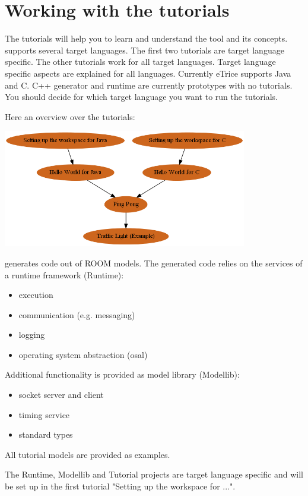 \section{Working with the tutorials}

The \eTrice{} tutorials will help you to learn and understand the \eTrice{} tool and its concepts. \eTrice{} supports 
several target languages. 
The first two tutorials are target language specific. The other tutorials work for all target languages. Target language specific aspects are explained for all languages. 
Currently eTrice supports Java and C. C++ generator and runtime are currently prototypes with no tutorials. You should decide for which target language you want to run the tutorials. 

Here an overview over the tutorials:

\includegraphics[width=0.8\textwidth]{images/012-tutorial-structure.png}

\eTrice{} generates code out of ROOM models. The generated code relies on the services of a runtime 
framework (Runtime):
\begin{itemize}
\item execution
\item communication (e.g. messaging)
\item logging
\item operating system abstraction (osal)
\end{itemize}

Additional functionality is provided as model library (Modellib): 
\begin{itemize}
\item socket server and client
\item timing service
\item standard types
\end{itemize}

All tutorial models are provided as examples.
 
The Runtime, Modellib and Tutorial projects are target language specific and will be set up in the first tutorial "Setting up the workspace for ...". 
 
